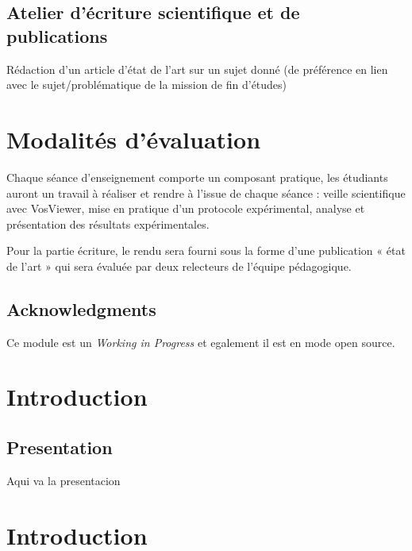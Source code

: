 \documentclass[
]{book}
\begin{document}
\hypertarget{atelier-duxe9criture-scientifique-et-de-publications-1}{%
\section{Atelier d'écriture scientifique et de publications}\label{atelier-duxe9criture-scientifique-et-de-publications-1}}

Rédaction d'un article d'état de l'art sur un sujet donné (de préférence en lien avec le sujet/problématique de la mission de fin d'études)

\hypertarget{modalituxe9s-duxe9valuation}{%
\chapter{Modalités d'évaluation}\label{modalituxe9s-duxe9valuation}}

Chaque séance d'enseignement comporte un composant pratique, les étudiants auront un travail à réaliser et rendre à l'issue de chaque séance : veille scientifique avec VosViewer, mise en pratique d'un protocole expérimental, analyse et présentation des résultats expérimentales.

Pour la partie écriture, le rendu sera fourni sous la forme d'une publication « état de l'art » qui sera évaluée par deux relecteurs de l'équipe pédagogique.

\hypertarget{acknowledgments}{%
\section{Acknowledgments}\label{acknowledgments}}

Ce module est un \emph{Working in Progress} et egalement il est en mode open source.

\hypertarget{introduction}{%
\chapter{Introduction}\label{introduction}}

\hypertarget{presentation}{%
\section{Presentation}\label{presentation}}

Aqui va la presentacion

\hypertarget{introduction-1}{%
\chapter{Introduction}\label{introduction-1}}
\end{document}
